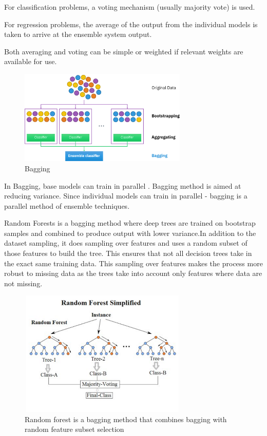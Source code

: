 \documentclass{article}
\begin{document}
For classification problems, a voting mechanism (usually majority vote) is used. 

For regression problems, the average of the output from the individual models is taken to arrive at the ensemble system output.

Both averaging and voting can be simple or weighted if relevant weights are available for use. 



\begin{figure}[H]
    \centering
    \includegraphics[width=8cm]{report-imgs/Ensemble_Bagging.png}
    \caption{Bagging \cite{wiki:bagging}}
    \label{bagging}
\end{figure}

In Bagging, base models can train in parallel \cite{rocca_2021}. Bagging method is aimed at reducing variance. Since individual models can train in parallel - bagging is a parallel method of ensemble techniques.


Random Forests is a bagging method where deep trees are trained on bootstrap samples and combined to produce output with lower variance.In addition to the dataset sampling, it does sampling over features and uses a random subset of those features to build the tree. This ensures that not all decision trees take in the exact same training data. This sampling over features makes the process more robust to missing data as the trees take into account only features where data are not missing.

\begin{figure}[H]
    \centering
    \includegraphics[width=8cm]{report-imgs/randomForest.png}
    \caption{Random forest is a bagging method that combines bagging with random feature subset selection \cite{randomForest}}
    \label{randomForest}
\end{figure}
\end{document}
